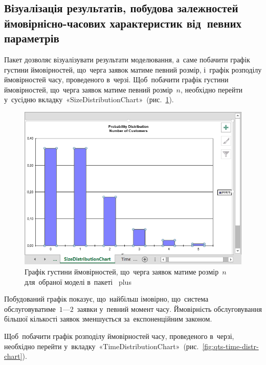 \documentclass[
  ukrainian,
  simple,
  floatsection,
]{eskdnaukvd}
\begin{document}
    \subsection{Візуалізація результатів, побудова залежностей ймовірнісно-часових характеристик від~певних параметрів}
      Пакет дозволяє візуалізувати результати моделювання, а~саме побачити графік густини ймовірностей, що~черга заявок матиме певний розмір, і~графік розподілу ймовірностей часу, проведеного в~черзі. Щоб~побачити графік густини ймовірностей, що~черга заявок матиме певний розмір~$n$, необхідно перейти у~сусідню вкладку~«\textenglish{SizeDistributionChart}»~(рис.~\ref{fig:qts-size-distr-chart}).

      \begin{figure}[!htbp]
        \centering
        \includegraphics[height = 12 \baselineskip]{./assets/04-qts-model-res-graph-01.png}
        \caption{Графік густини ймовірностей, що~черга заявок матиме розмір~$n$ для~обраної моделі в~пакеті~\textenglish{ plus }}
        \label{fig:qts-size-distr-chart}
      \end{figure}

      Побудований графік показує, що~найбільш імовірно, що~система обслуговуватиме~$1—2$~заявки у~певний момент часу. Ймовірність обслуговування більшої кількості заявок зменшується за~експоненційним законом.

      Щоб~побачити графік розподілу ймовірностей часу, проведеного в~черзі, необхідно перейти у~вкладку~«\textenglish{TimeDistributionChart}»~(рис.~\ref{fig:qts-time-distr-chart}).
\end{document}
